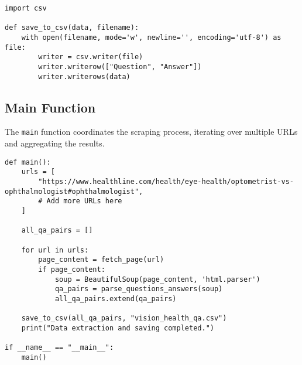 \documentclass[a4paper,12pt]{article}
\begin{document}
\begin{lstlisting}
import csv

def save_to_csv(data, filename):
    with open(filename, mode='w', newline='', encoding='utf-8') as file:
        writer = csv.writer(file)
        writer.writerow(["Question", "Answer"])
        writer.writerows(data)
\end{lstlisting}

\subsection{Main Function}
The \texttt{main} function coordinates the scraping process, iterating over multiple URLs and aggregating the results.

\begin{lstlisting}
def main():
    urls = [
        "https://www.healthline.com/health/eye-health/optometrist-vs-ophthalmologist#ophthalmologist",
        # Add more URLs here
    ]
    
    all_qa_pairs = []

    for url in urls:
        page_content = fetch_page(url)
        if page_content:
            soup = BeautifulSoup(page_content, 'html.parser')
            qa_pairs = parse_questions_answers(soup)
            all_qa_pairs.extend(qa_pairs)
    
    save_to_csv(all_qa_pairs, "vision_health_qa.csv")
    print("Data extraction and saving completed.")

if __name__ == "__main__":
    main()
\end{lstlisting}
\end{document}
